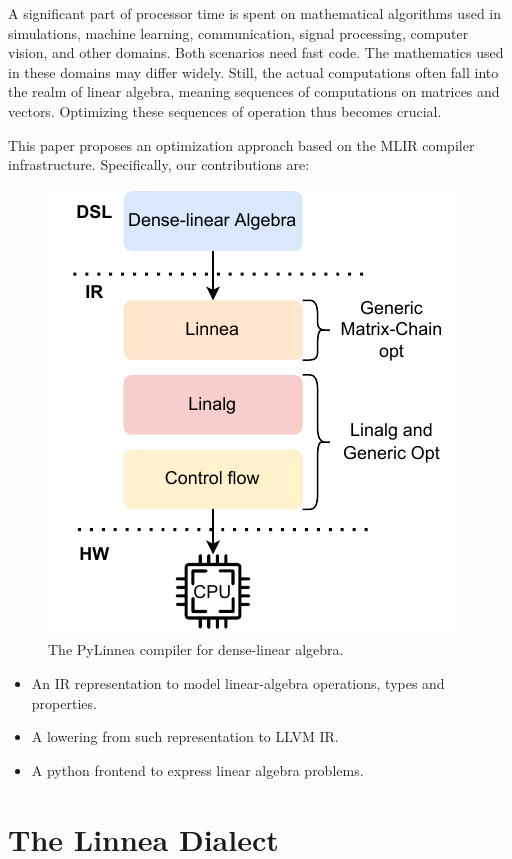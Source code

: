\documentclass[conference]{IEEEtran}
\begin{document}
A significant part of processor time is spent on mathematical algorithms used
in simulations, machine learning, communication, signal processing, computer
vision, and other domains. Both scenarios need fast code. The mathematics used
in these domains may differ widely. Still, the actual computations often fall
into the realm of linear algebra, meaning sequences of computations on matrices
and vectors. Optimizing these sequences of operation thus becomes crucial.

This paper proposes an optimization approach based on the MLIR compiler
infrastructure. Specifically, our contributions are:

\begin{figure}
%
\includegraphics[width=0.6\columnwidth]{images/Impact2022.drawio.pdf}
\caption{The PyLinnea compiler for dense-linear algebra.}
\end{figure}

\begin{itemize}
	\item An IR representation to model linear-algebra operations, types and properties.
	\item A lowering from such representation to LLVM IR.
  \item A python frontend to express linear algebra problems.
\end{itemize}

\section{The Linnea Dialect}
\end{document}
